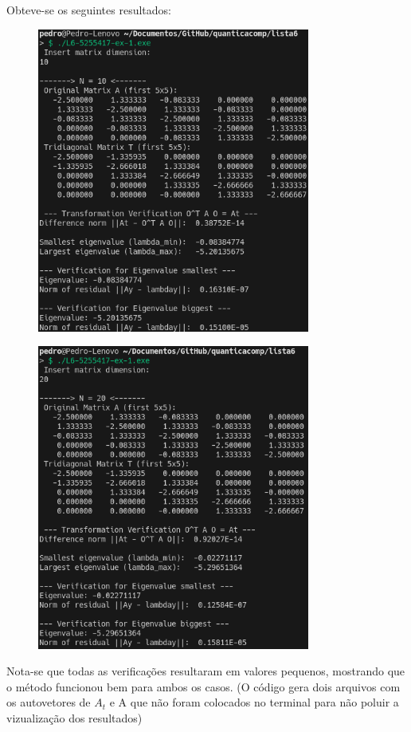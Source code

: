 \documentclass[12pt, a4paper]{article} %
\begin{document}
        Obteve-se os seguintes resultados:
        \begin{figure}[H]
            \centering
            \includegraphics[width=0.8\textwidth]{../images/ex1-10.png}
        \end{figure}
        \begin{figure}[H]
            \centering
            \includegraphics[width=0.8\textwidth]{../images/ex1-20.png}
        \end{figure}

        Nota-se que todas as verifica\c{c}\~oes resultaram em valores pequenos, mostrando que o m\'etodo funcionou bem para ambos os casos.
        (O c\'odigo gera dois arquivos com os autovetores de $A_t$ e A que n\~ao foram colocados no terminal para n\~ao poluir a vizualiza\c{c}\~ao dos resultados)
\end{document}
